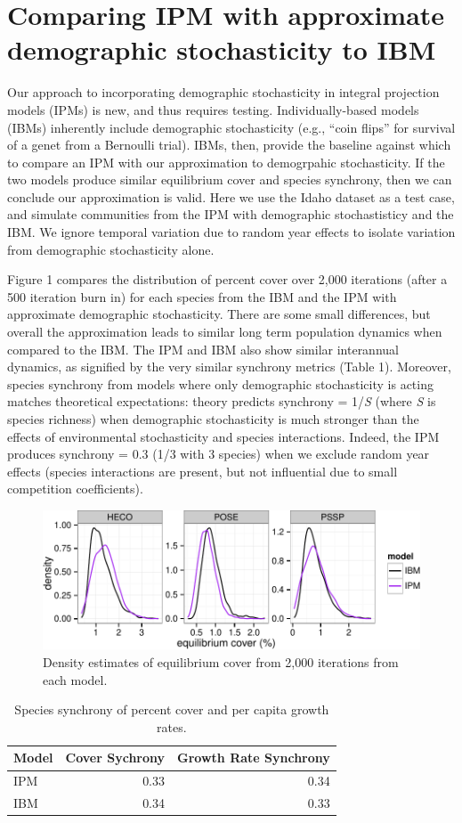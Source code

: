 \documentclass[12pt,]{article}
\author{}
\date{}
\begin{document}
\normalsize


\section{Comparing IPM with approximate demographic stochasticity to
IBM}\label{comparing-ipm-with-approximate-demographic-stochasticity-to-ibm}

Our approach to incorporating demographic stochasticity in integral
projection models (IPMs) is new, and thus requires testing.
Individually-based models (IBMs) inherently include demographic
stochasticity (e.g., ``coin flips'' for survival of a genet from a
Bernoulli trial). IBMs, then, provide the baseline against which to
compare an IPM with our approximation to demogrpahic stochasticity. If
the two models produce similar equilibrium cover and species synchrony,
then we can conclude our approximation is valid. Here we use the Idaho
dataset as a test case, and simulate communities from the IPM with
demographic stochastisticy and the IBM. We ignore temporal variation due
to random year effects to isolate variation from demographic
stochasticity alone.

Figure 1 compares the distribution of percent cover over 2,000
iterations (after a 500 iteration burn in) for each species from the IBM
and the IPM with approximate demographic stochasticity. There are some
small differences, but overall the approximation leads to similar long
term population dynamics when compared to the IBM. The IPM and IBM also
show similar interannual dynamics, as signified by the very similar
synchrony metrics (Table 1). Moreover, species synchrony from models
where only demographic stochasticity is acting matches theoretical
expectations: theory predicts synchrony = 1/\emph{S} (where \emph{S} is
species richness) when demographic stochasticity is much stronger than
the effects of environmental stochasticity and species interactions.
Indeed, the IPM produces synchrony = 0.3 (1/3 with 3 species) when we
exclude random year effects (species interactions are present, but not
influential due to small competition coefficients).

\begin{figure}[htbp]
\centering
\includegraphics{./demog_stoch_test_files/figure-latex/figs.pdf}
\caption{Density estimates of equilibrium cover from 2,000 iterations
from each model.}
\end{figure}

\begin{table}[ht]
\centering
\caption{Species synchrony of percent cover and per capita growth rates.} 
\begin{tabular}{lrr}
  \hline
Model & Cover Sychrony & Growth Rate Synchrony \\ 
  \hline
IPM & 0.33 & 0.34 \\ 
  IBM & 0.34 & 0.33 \\ 
   \hline
\end{tabular}
\end{table}
\end{document}

